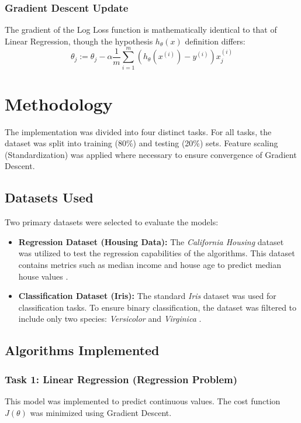 \documentclass[11pt]{article}
\begin{document}
\subsubsection{Gradient Descent Update}
The gradient of the Log Loss function is mathematically identical to that of Linear Regression, though the hypothesis $h_\theta(x)$ definition differs:
\begin{equation}
    \theta_j := \theta_j - \alpha \frac{1}{m} \sum_{i=1}^{m} \left( h_\theta(x^{(i)}) - y^{(i)} \right) x_j^{(i)}
\end{equation}

\section{Methodology}
The implementation was divided into four distinct tasks. For all tasks, the dataset was split into training (80\%) and testing (20\%) sets. Feature scaling (Standardization) was applied where necessary to ensure convergence of Gradient Descent.

\subsection{Datasets Used}
Two primary datasets were selected to evaluate the models:
\begin{itemize}
    \item \textbf{Regression Dataset (Housing Data):} The \textit{California Housing} dataset was utilized to test the regression capabilities of the algorithms. This dataset contains metrics such as median income and house age to predict median house values \cite{pace1997sparse}.
    \item \textbf{Classification Dataset (Iris):} The standard \textit{Iris} dataset was used for classification tasks. To ensure binary classification, the dataset was filtered to include only two species: \textit{Versicolor} and \textit{Virginica} \cite{fisher1936use}.
\end{itemize}

\subsection{Algorithms Implemented}

\subsubsection{Task 1: Linear Regression (Regression Problem)}
This model was implemented to predict continuous values. The cost function $J(\theta)$ was minimized using Gradient Descent.
\end{document}
